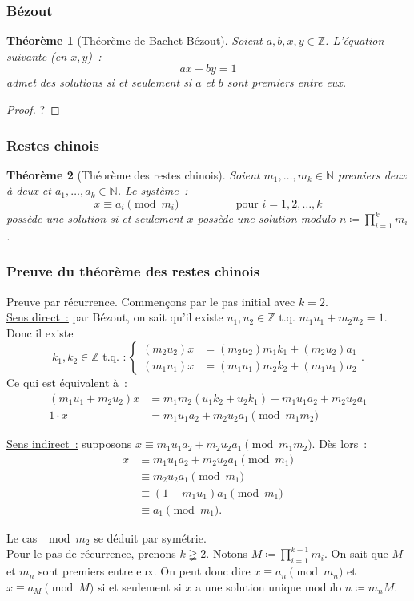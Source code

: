\documentclass[10pt, mathserif]{beamer}
\newcommand{\tq}{\text{ t.q. }}
\newcommand{\Z}{\mathbb Z}
\newcommand{\N}{\mathbb N}
\newtheorem{thm}{Théorème}[section]
\theoremstyle{definition}
\theoremstyle{remark}
\begin{document}
	\begin{frame}
		\frametitle{Bézout}
		\begin{thm}[Théorème de Bachet-Bézout]
			Soient $a, b, x, y \in \Z$. L'équation suivante (en $x, y$)~: \[ax + by = 1\]
			admet des solutions si et seulement si $a$ et $b$ sont premiers entre eux.
		\end{thm}

		\begin{proof}
			?
		\end{proof}
	\end{frame}

	\begin{frame}
		\frametitle{Restes chinois}
		\begin{thm}[Théorème des restes chinois]
			Soient $m_1, \dotsc, m_k \in \N$ premiers deux à deux et $a_1, \dotsc, a_k \in \N$. Le système~:
			\[x \equiv a_i \pmod {m_i}\hspace{2cm}\text{ pour } i = 1, 2,  \dotsc, k\]
			possède une solution si et seulement $x$ possède une solution modulo $n \coloneqq \prod_{i=1}^km_i$.
		\end{thm}
	\end{frame}

	\begin{frame}
		\frametitle{Preuve du théorème des restes chinois}
		Preuve par récurrence. Commençons par le pas initial avec $k = 2$. \\
		\underline{Sens direct~:} par Bézout, on sait qu'il existe $u_1, u_2 \in \Z \tq m_1u_1 + m_2u_2 = 1$. Donc il existe
		\[k_1, k_2 \in \Z \tq :\begin{cases}(m_2u_2)x &= (m_2u_2)m_1k_1 + (m_2u_2)a_1 \\ (m_1u_1)x &= (m_1u_1)m_2k_2 + (m_1u_1)a_2\end{cases}.\]
		Ce qui est équivalent à~:
		\[\begin{aligned}
			(m_1u_1 + m_2u_2)x &= m_1m_2(u_1k_2 + u_2k_1) + m_1u_1a_2 + m_2u_2a_1 \\
			1 \cdot x &= m_1u_1a_2 + m_2u_2a_1 \pmod {m_1m_2}
		\end{aligned}\]
	\end{frame}

	\begin{frame}
		\underline{Sens indirect~:} supposons $x \equiv m_1u_1a_2 + m_2u_2a_1 \pmod {m_1m_2}$. Dès lors~:
		\[\begin{aligned}
			x &\equiv m_1u_1a_2 + m_2u_2a_1 \pmod {m_1} \\
			  &\equiv m_2u_2a_1 \pmod {m_1} \\
			  &\equiv (1 - m_1u_1)a_1 \pmod {m_1} \\
			  &\equiv a_1 \pmod {m_1}.
		\end{aligned}\]

		Le cas $\mod m_2$ se déduit par symétrie. \\
		Pour le pas de récurrence, prenons $k \gneqq 2$. Notons $M \coloneqq \prod_{i=1}^{k-1}m_i$. On sait que $M$ et $m_n$ sont premiers entre eux.
		On peut donc dire $x \equiv a_n \pmod {m_n}$ et $x \equiv a_M \pmod {M}$ si et seulement si $x$ a une solution unique modulo $n \coloneqq m_nM$.
	\end{frame}
\end{document}
